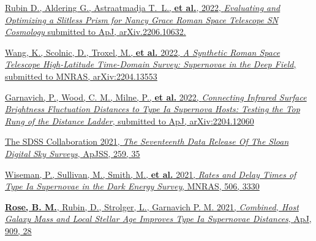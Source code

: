 \documentclass[margin]{res}
\begin{document}
\begin{resume}
\hangindent=15pt 
\href{https://ui.adsabs.harvard.edu/link_gateway/2022arXiv220610632R/EPRINT_HTML}{Rubin D., Aldering G., Astraatmadja T.~L., \textbf{et al.}, 2022, {\sl Evaluating and Optimizing a Slitless Prism for Nancy Grace Roman Space Telescope SN Cosmology} submitted to ApJ, arXiv.2206.10632.}
\vspace{-12pt}

\hangindent=15pt 
\href{https://ui.adsabs.harvard.edu/abs/2022arXiv220413553W/abstract}{Wang, K., Scolnic, D., Troxel, M., \textbf{et al.} 2022, {\sl A Synthetic Roman Space Telescope High-Latitude Time-Domain Survey: Supernovae in the Deep Field}, submitted to MNRAS, arXiv:2204.13553}
\vspace{-12pt}

\hangindent=15pt 
\href{https://ui.adsabs.harvard.edu/abs/2022arXiv220412060G/abstract}{Garnavich, P., Wood, C. M., Milne, P., \textbf{et al.} 2022, {\sl Connecting Infrared Surface Brightness Fluctuation Distances to Type Ia Supernova Hosts: Testing the Top Rung of the Distance Ladder}, submitted to ApJ, arXiv:2204.12060}
\vspace{-12pt}


\hangindent=15pt 
\href{https://ui.adsabs.harvard.edu/abs/2022ApJS..259...35A/abstract}{The SDSS Collaboration 2021, {\sl The Seventeenth Data Release Of The Sloan Digital Sky Surveys}, ApJSS, 259, 35} 
\vspace{-12pt}


\hangindent=15pt 
\href{https://ui.adsabs.harvard.edu/abs/2021MNRAS.tmp.1758W/abstract}{Wiseman, P., Sullivan, M., Smith, M., {\bf et al.} 2021, {\sl Rates and Delay Times of Type Ia Supernovae in the Dark Energy Survey}, MNRAS, 506, 3330} 
\vspace{-12pt}


\hangindent=15pt 
\href{https://ui.adsabs.harvard.edu/abs/2020arXiv201201460R/abstract}{{\bf Rose, B. M.}, Rubin, D., Strolger, L., Garnavich P. M. 2021, {\sl Combined, Host Galaxy Mass and Local Stellar Age Improves Type Ia Supernovae Distances}, ApJ, 909, 28} %
\vspace{-12pt}


\end{resume}
\end{document}
